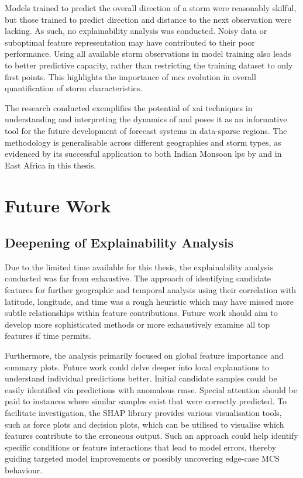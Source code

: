 Models trained to predict the overall direction of a storm were reasonably skilful, but those trained to predict direction and distance to the next observation were lacking. As such, no explainability analysis was conducted. Noisy data or suboptimal feature representation may have contributed to their poor performance. Using all available storm observations in model training also leads to better predictive capacity, rather than restricting the training dataset to only first points. This highlights the importance of \acrshort{mcs} evolution in overall quantification of storm characteristics.

The research conducted exemplifies the potential of \acrshort{xai} techniques in understanding and interpreting the dynamics of  and poses it as an informative tool for the future development of forecast systems in data-sparse regions. The methodology is generalisable across different geographies and storm types, as evidenced by its successful application to both Indian Monsoon \acrlong{lps} by \cite{Hunt2024} and  in East Africa in this thesis.

\section{Future Work}
\label{sec:future-work}

\subsection{Deepening of Explainability Analysis}

Due to the limited time available for this thesis, the explainability analysis conducted was far from exhaustive. The approach of identifying candidate features for further geographic and temporal analysis using their correlation with latitude, longitude, and time was a rough heuristic which may have missed more subtle relationships within feature contributions. Future work should aim to develop more sophisticated methods or more exhaustively examine all top features if time permits.

Furthermore, the analysis primarily focused on global feature importance and summary plots. Future work could delve deeper into local explanations to understand individual predictions better. Initial candidate samples could be easily identified via predictions with anomalous \acrshort{rmse}. Special attention should be paid to instances where similar samples exist that were correctly predicted. To facilitate investigation, the SHAP library provides various visualisation tools, such as force plots and decision plots, which can be utilised to visualise which features contribute to the erroneous output. Such an approach could help identify specific conditions or feature interactions that lead to model errors, thereby guiding targeted model improvements or possibly uncovering edge-case MCS behaviour.

